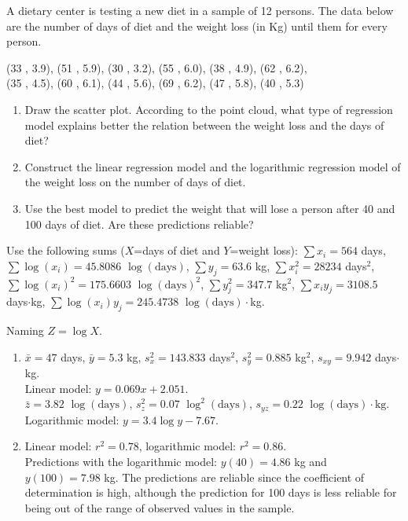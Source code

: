 {A dietary center is testing a new diet in a sample of 12 persons.
The data below are the number of days of diet and the weight loss (in Kg) until them for every person.
\begin{center}
(33 , 3.9), (51 , 5.9), (30 , 3.2), (55 , 6.0), (38 , 4.9), (62 , 6.2),\\
(35 , 4.5), (60 , 6.1), (44 , 5.6), (69 , 6.2), (47 , 5.8), (40 , 5.3)
\end{center}
\begin{enumerate}
\item Draw the scatter plot. According to the point cloud, what type of regression model explains better the relation
between the weight loss and the days of diet?
\item Construct the linear regression model and the logarithmic regression model of the weight loss on the number of days of diet.
\item Use the best model to predict the weight that will lose a person after 40 and 100 days of diet.
Are these predictions reliable?
\end{enumerate}
Use the following sums ($X$=days of diet and $Y$=weight loss): $\sum x_i=564$ days, $\sum \log(x_i)=45.8086$
$\log(\mbox{days})$, $\sum y_j=63.6$ kg, $\sum x_i^2=28234$ days$^2$, $\sum \log(x_i)^2=175.6603$ $\log(\mbox{days})^2$, $\sum y_j^2=347.7$ kg$^2$, $\sum x_iy_j=3108.5$ days$\cdot$kg, $\sum \log(x_i)y_j=245.4738$ $\log(\mbox{days})\cdot$kg.
}
{Naming $Z=\log X$.
\begin{enumerate}[start=2]
\item $\bar x=47$ days, $\bar y=5.3$ kg, $s_x^2=143.833$ days$^2$, $s_y^2=0.885$ kg$^2$, $s_{xy}=9.942$ days$\cdot$kg.\\
Linear model: $y=0.069x+2.051$.\\
$\bar z=3.82$ $\log(\mbox{days})$, $s_z^2=0.07$ $\log^2(\mbox{days})$, $s_{yz}=0.22$ $\log(\mbox{days})\cdot\mbox{kg}$.\\
Logarithmic model: $y=3.4\log y-7.67$.
\item Linear model: $r^2=0.78$, logarithmic model: $r^2=0.86$.\\
Predictions with the logarithmic model: $y(40)=4.86$ kg and $y(100)=7.98$ kg.
The predictions are reliable since the coefficient of determination is high, although the prediction for 100 days is less reliable for being out of the range of observed values in the sample.
\end{enumerate}
}
{}



